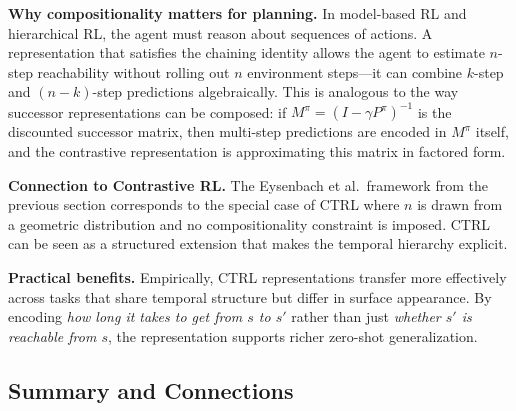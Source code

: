 \documentclass[11pt, letterpaper]{article}
\begin{document}
\begin{remark}
    \textbf{Why compositionality matters for planning.} In model-based RL and hierarchical RL, the agent must reason about sequences of actions. A representation that satisfies the chaining identity allows the agent to estimate \(n\)-step reachability without rolling out \(n\) environment steps---it can combine \(k\)-step and \((n-k)\)-step predictions algebraically. This is analogous to the way successor representations can be composed: if \(M^\pi = (I - \gamma P^\pi)^{-1}\) is the discounted successor matrix, then multi-step predictions are encoded in \(M^\pi\) itself, and the contrastive representation is approximating this matrix in factored form.
 
    \textbf{Connection to Contrastive RL.} The Eysenbach et al.\ framework from the previous section corresponds to the special case of CTRL where \(n\) is drawn from a geometric distribution and no compositionality constraint is imposed. CTRL can be seen as a structured extension that makes the temporal hierarchy explicit.
 
    \textbf{Practical benefits.} Empirically, CTRL representations transfer more effectively across tasks that share temporal structure but differ in surface appearance. By encoding \textit{how long it takes to get from \(s\) to \(s'\)} rather than just \textit{whether \(s'\) is reachable from \(s\)}, the representation supports richer zero-shot generalization.
\end{remark}
 
\subsection{Summary and Connections}
 
\end{document}
